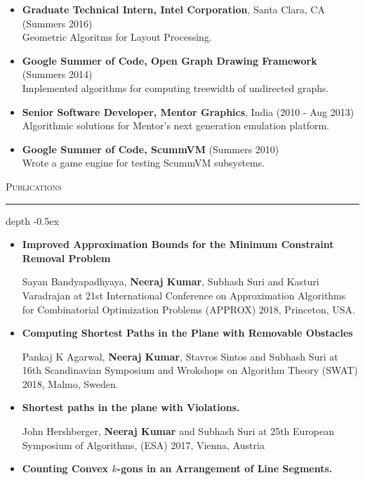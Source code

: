 \documentclass[11pt]{article}
\def\Vhrulefill{\leavevmode\leaders\hrule height 1.2ex depth \dimexpr2pt-0.5ex\hfill\kern0pt}
\begin{document}
{\begin{itemize}
	\item \textbf{Graduate Technical Intern, Intel Corporation}, Santa Clara, CA \hfill(Summers 2016) \\
        Geometric Algoritms for Layout Processing.
	
    \item \textbf{Google Summer of Code, Open Graph Drawing Framework} \hfill(Summers 2014) \\
		Implemented algorithms for computing treewidth of undirected graphs.

	\item \textbf{Senior Software Developer, Mentor Graphics}, India \hfill(2010 - Aug 2013) \\
		Algorithmic solutions for Mentor's next generation emulation platform.
	
	\item \textbf{Google Summer of Code, ScummVM} \hfill(Summers 2010) \\
		Wrote a game engine for testing ScummVM subsystems.
\end{itemize}

\medskip
\noindent\textsc{Publications}
\textcolor{mygray}{\noindent\Vhrulefill}
\begin{itemize}
    \item \textbf{Improved Approximation Bounds for the Minimum Constraint Removal Problem}
				
				Sayan Bandyapadhyaya,  \textbf{Neeraj Kumar}, Subhash Suri and Kasturi Varadrajan at
				21st International Conference on Approximation Algorithms for Combinatorial Optimization Problems (APPROX) 2018,
				Princeton, USA.


    \item \textbf{Computing Shortest Paths in the Plane with Removable Obstacles}
        
        Pankaj K Agarwal, \textbf{Neeraj Kumar}, Stavros Sintos and Subhash Suri at
				16th Scandinavian Symposium and Wrokshops on Algorithm Theory (SWAT) 2018, Malmo, Sweden.
    
    \item \textbf{Shortest paths in the plane with Violations.}

        John Hershberger, \textbf{Neeraj Kumar} and Subhash Suri at
        25th European Symposium of Algorithms, (ESA) 2017, Vienna, Austria


    \item \textbf{Counting Convex $k$-gons in an Arrangement of Line Segments.} 
    

\end{itemize}}
\end{document}
